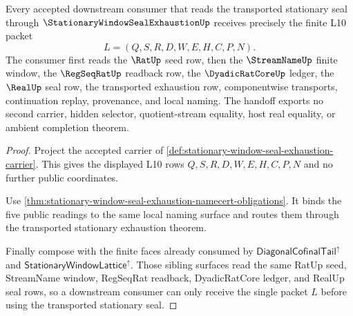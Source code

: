 \begin{theorem}
\label{thm:stationary-window-seal-exhaustion-l10-handoff}
Every accepted downstream consumer that reads the transported stationary seal through $\StationaryWindowSealExhaustionUp$ receives precisely the finite L10 packet
$$
L=(Q,S,R,D,W,E,H,C,P,N).
$$
The consumer first reads the $\RatUp$ seed row, then the $\StreamNameUp$ finite window, the $\RegSeqRatUp$ readback row, the $\DyadicRatCoreUp$ ledger, the $\RealUp$ seal row, the transported exhaustion row, componentwise transports, continuation replay, provenance, and local naming. The handoff exports no second carrier, hidden selector, quotient-stream equality, host real equality, or ambient completion theorem.
\end{theorem}
\begin{proof}
Project the accepted carrier of \autoref{def:stationary-window-seal-exhaustion-carrier}. This gives the displayed L10 rows $Q,S,R,D,W,E,H,C,P,N$ and no further public coordinates.

Use \autoref{thm:stationary-window-seal-exhaustion-namecert-obligations}. It binds the five public readings to the same local naming surface and routes them through the transported stationary exhaustion theorem.

Finally compose with the finite faces already consumed by $\mathsf{DiagonalCofinalTail}^{\uparrow}$ and $\mathsf{StationaryWindowLattice}^{\uparrow}$. Those sibling surfaces read the same RatUp seed, StreamName window, RegSeqRat readback, DyadicRatCore ledger, and RealUp seal rows, so a downstream consumer can only receive the single packet $L$ before using the transported stationary seal.
\end{proof}

